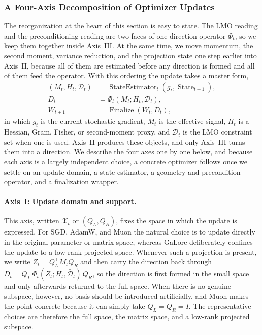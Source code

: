 
\subsubsection{A Four-Axis Decomposition of Optimizer Updates}
\label{sec:four-axis-decomposition}

The reorganization at the heart of this section is easy to state. The LMO reading and the preconditioning reading are two faces of one direction operator $\Phi_t$, so we keep them together inside Axis~III. At the same time, we move momentum, the second moment, variance reduction, and the projection state one step earlier into Axis~II, because all of them are estimated before any direction is formed and all of them feed the operator. With this ordering the update takes a master form,
\begin{align}
  (M_t,H_t,\mathcal{D}_t)
  &=\operatorname{StateEstimator}_t(g_t,\operatorname{State}_{t-1}),
    \label{eq:state-estimator}\\
  D_t &=\Phi_t(M_t;H_t,\mathcal{D}_t),
    \label{eq:geometry-operator}\\
  W_{t+1} &=\operatorname{Finalize}(W_t,D_t),
    \label{eq:finalize}
\end{align}
in which $g_t$ is the current stochastic gradient, $M_t$ is the effective signal, $H_t$ is a Hessian, Gram, Fisher, or second-moment proxy, and $\mathcal{D}_t$ is the LMO constraint set when one is used. Axis~II produces these objects, and only Axis~III turns them into a direction. We describe the four axes one by one below, and because each axis is a largely independent choice, a concrete optimizer follows once we settle on an update domain, a state estimator, a geometry-and-precondition operator, and a finalization wrapper.

\paragraph{Axis~I: Update domain and support.}
This axis, written $\mathcal{X}_t$ or $(Q_L,Q_R)$, fixes the space in which the update is expressed. For SGD, AdamW, and Muon the natural choice is to update directly in the original parameter or matrix space, whereas GaLore deliberately confines the update to a low-rank projected space. Whenever such a projection is present, we write $Z_t=Q_L^\top M_t Q_R$ and then carry the direction back through $D_t=Q_L\,\Phi_t(Z_t;\bar{H}_t,\bar{\mathcal{D}}_t)\,Q_R^\top$, so the direction is first formed in the small space and only afterwards returned to the full space. When there is no genuine subspace, however, no basis should be introduced artificially, and Muon makes the point concrete because it can simply take $Q_L=Q_R=I$. The representative choices are therefore the full space, the matrix space, and a low-rank projected subspace.

